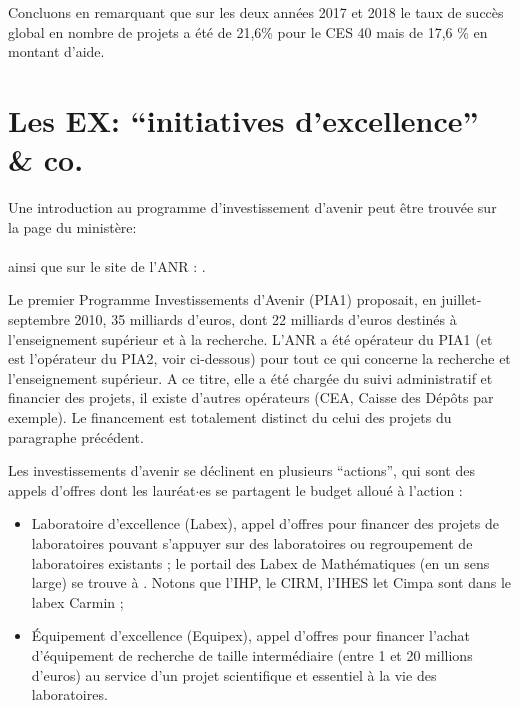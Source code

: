 Concluons en remarquant que sur les deux ann\'ees 2017 et 2018 le taux de succès global en nombre de projets a \'et\'e de 21,6\% pour le CES 40 mais de 17,6 \% en montant d'aide.


\section{Les EX: ``initiatives d'excellence'' \& co.}\label{trucenex}
Une introduction au programme d'\og{}investissement d'avenir\fg{} peut \^etre trouv\'ee sur la page du minist\`ere: \\
{\small {}} \\
ainsi que sur le site de l'ANR : 
. 

Le premier Programme Investissements d'Avenir (PIA1) proposait, en juillet-septembre 2010, 35 milliards d'euros, 
dont 22 milliards d'euros destin\'es \`a l'enseignement sup\'erieur et \`a la recherche.
L'ANR a {\'e}t{\'e} op{\'e}rateur du PIA1 (et est l'op{\'e}rateur du PIA2, voir ci-dessous) 
pour tout ce qui concerne la recherche et l'enseignement sup{\'e}rieur. 
A ce titre, elle a {\'e}t{\'e} charg{\'e}e du suivi administratif et financier des projets, 
il existe d'autres op{\'e}rateurs (CEA, Caisse des D{\'e}pôts par exemple). 
Le financement est totalement distinct du celui des projets du paragraphe pr{\'e}c{\'e}dent.

Les investissements d'avenir se d\'eclinent en plusieurs ``actions'', qui sont des appels d'offres dont les laur\'eat$\cdot$es 
se partagent le budget allou\'e \`a l'action :
\begin{itemize}
\item Laboratoire d'excellence (Labex), appel d'offres pour financer des projets de laboratoires pouvant s'appuyer 
sur des laboratoires ou regroupement de laboratoires existants ; 
le portail des Labex de Math{\'e}matiques (en un sens large) se trouve {\`a}  . 
Notons que l'IHP, le CIRM, l'IHES let Cimpa sont dans le labex Carmin ; %
\item \'Equipement d'excellence (Equipex), appel d'offres pour financer l'achat d'\'equipement de recherche 
de taille interm\'ediaire (entre 1 et 20 millions d'euros) au service d'un projet scientifique et 
essentiel \`a la vie des laboratoires.
\end{itemize}

